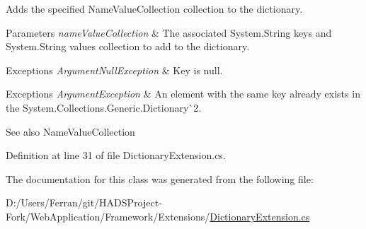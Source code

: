 Adds the specified {\ttfamily Name\+Value\+Collection} collection to the dictionary. 


\begin{DoxyParams}{Parameters}
{\em name\+Value\+Collection} & The associated {\ttfamily System.\+String} keys and {\ttfamily System.\+String} values collection to add to the dictionary. \\
\hline
\end{DoxyParams}



\begin{DoxyExceptions}{Exceptions}
{\em Argument\+Null\+Exception} & Key is null. \\
\hline
\end{DoxyExceptions}



\begin{DoxyExceptions}{Exceptions}
{\em Argument\+Exception} & An element with the same key already exists in the {\ttfamily System.\+Collections.\+Generic.\+Dictionary\`{}2}. \\
\hline
\end{DoxyExceptions}


\begin{DoxySeeAlso}{See also}
Name\+Value\+Collection


\end{DoxySeeAlso}


Definition at line 31 of file Dictionary\+Extension.\+cs.



The documentation for this class was generated from the following file\+:\begin{DoxyCompactItemize}
\item 
D\+:/\+Users/\+Ferran/git/\+H\+A\+D\+S\+Project-\/\+Fork/\+Web\+Application/\+Framework/\+Extensions/\mbox{\hyperlink{DictionaryExtension_8cs}{Dictionary\+Extension.\+cs}}\end{DoxyCompactItemize}
